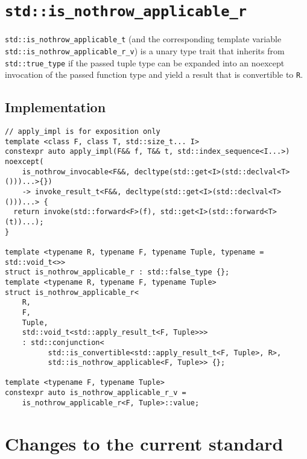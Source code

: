 \documentclass{article}
\begin{document}
\section{\texttt{std::is\_nothrow\_applicable\_r}}
\texttt{std::is\_nothrow\_applicable\_t} (and the corresponding template
variable \texttt{std::is\_nothrow\_applicable\_r\_v}) is a unary type trait
that inherits from \texttt{std::true\_type} if the passed tuple type can be
expanded into an noexcept invocation of the passed function type and yield a
result that is convertible to \texttt{R}.

\subsection{Implementation}
\begin{lstlisting}
// apply_impl is for exposition only
template <class F, class T, std::size_t... I>
constexpr auto apply_impl(F&& f, T&& t, std::index_sequence<I...>) noexcept(
    is_nothrow_invocable<F&&, decltype(std::get<I>(std::declval<T>()))...>{})
    -> invoke_result_t<F&&, decltype(std::get<I>(std::declval<T>()))...> {
  return invoke(std::forward<F>(f), std::get<I>(std::forward<T>(t))...);
}

template <typename R, typename F, typename Tuple, typename = std::void_t<>>
struct is_nothrow_applicable_r : std::false_type {};
template <typename R, typename F, typename Tuple>
struct is_nothrow_applicable_r<
    R,
    F,
    Tuple,
    std::void_t<std::apply_result_t<F, Tuple>>>
    : std::conjunction<
          std::is_convertible<std::apply_result_t<F, Tuple>, R>,
          std::is_nothrow_applicable<F, Tuple>> {};

template <typename F, typename Tuple>
constexpr auto is_nothrow_applicable_r_v =
    is_nothrow_applicable_r<F, Tuple>::value;
\end{lstlisting}

\section{Changes to the current standard}
\end{document}
